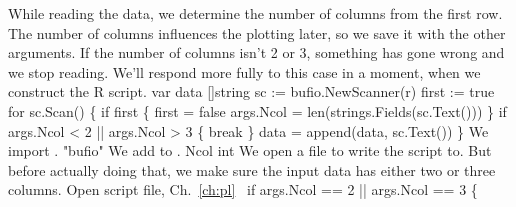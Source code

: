 While reading the data, we determine the number of columns from the
first row. The number of columns influences the plotting later, so we
save it with the other arguments. If the number of columns isn't 2 or
3, something has gone wrong and we stop reading. We'll respond more
fully to this case in a moment, when we construct the R script.
\nwenddocs{}\endmoddef\nwstartdeflinemarkup{}\nwenddeflinemarkup
var data []string
sc := bufio.NewScanner(r)
first := true
for sc.Scan() \{
          if first \{
                  first = false
                  args.Ncol = len(strings.Fields(sc.Text()))
          \}
          if args.Ncol < 2 || args.Ncol > 3 \{ break \}
          data = append(data, sc.Text())
\}
\nwendcode{}\nwdocspar
We import .
\nwenddocs{}\plusendmoddef\nwstartdeflinemarkup{}\nwenddeflinemarkup
"bufio"
\nwendcode{}\nwdocspar
We add  to .
\nwenddocs{}\plusendmoddef\nwstartdeflinemarkup{}\nwenddeflinemarkup
Ncol int
\nwendcode{}\nwdocspar
We open a file to write the script to. But before actually doing that,
we make sure the input data has either two or three columns.
\nwenddocs{}\endmoddef\nwstartdeflinemarkup{}\nwenddeflinemarkup
\LA{}Open script file, Ch.~\ref{ch:pl}~{\nwtagstyle{}}\RA{}
if args.Ncol == 2 || args.Ncol == 3 \{
